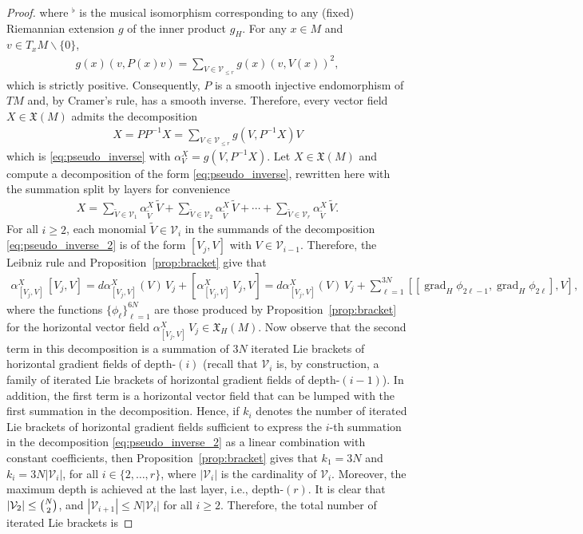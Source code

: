 \documentclass{article}
\theoremstyle{remark}
\newcommand{\M}{M}
\newcommand{\X}{\mathfrak{X}(\M)}
\newcommand{\XH}{\mathfrak{X}_H(\M)}
\DeclareMathOperator{\grad}{\mathrm{grad}}
\begin{document}
\begin{proof}
    where $^\flat$ is the musical isomorphism corresponding to any (fixed) Riemannian extension $g$ of the inner product $g_H$. For any $x\in \M$ and $v\in T_x\M\backslash\{0\}$,
    \begin{align*}
        g(x)(v,P(x)v) = \sum_{V\in\mathcal{V}_{\leq r}} g(x)(v,V(x))^2,
    \end{align*}
    which is strictly positive. Consequently, $P$ is a smooth injective endomorphism of $T\M$ and, by Cramer's rule, has a smooth inverse. Therefore, every vector field $X\in\X$ admits the decomposition
    \begin{align*}
        X = PP^{-1}X = \sum_{V\in\mathcal{V}_{\leq r}} g(V,P^{-1}X) V
    \end{align*}
    which is \eqref{eq:pseudo_inverse} with $\alpha_V^X=g(V,P^{-1}X)$.
    Let $X\in\X$ and compute a decomposition of the form \eqref{eq:pseudo_inverse}, rewritten here with the summation split by layers for convenience
    \begin{align}
        X = \sum_{\tilde{V}\in\mathcal{V}_{1}}\alpha_{\tilde{V}}^X \,\tilde{V} + \sum_{\tilde{V}\in\mathcal{V}_{2}}\alpha_{\tilde{V}}^X \,\tilde{V} + \cdots + \sum_{\tilde{V}\in\mathcal{V}_{r}}\alpha_{\tilde{V}}^X \,\tilde{V}. \label{eq:pseudo_inverse_2}
    \end{align}
    For all $i\geq 2$, each monomial $\tilde{V}\in \mathcal{V}_{i}$ in the summands of the decomposition \eqref{eq:pseudo_inverse_2} is of the form $[V_j,V]$ with $V\in \mathcal{V}_{i-1}$. Therefore, the Leibniz rule and Proposition~\ref{prop:bracket} give that
    \begin{align*}
        \alpha_{[V_j,V]}^X \,[V_j,V] = d\alpha_{[V_j,V]}^X(V) \, V_j + [\alpha_{[V_j,V]}^X\,V_j, V] =  d\alpha_{[V_j,V]}^X(V) \,V_j + \sum_{\ell=1}^{3N}[[\grad_H\phi_{2\ell-1},\grad_H\phi_{2\ell}], V], 
    \end{align*}
    where the functions $\{\phi_{\ell}\}_{\ell=1}^{6N}$ are those produced by Proposition~\ref{prop:bracket} for the horizontal vector field $\alpha_{[V_j,V]}^X\,V_j\in\XH$. Now observe that the second term in this decomposition is a summation of $3N$ iterated Lie brackets of horizontal gradient fields of depth-$(i)$ (recall that $\mathcal{V}_{i}$ is, by construction, a family of iterated Lie brackets of horizontal gradient fields of depth-$(i-1)$). In addition, the first term is a horizontal vector field that can be lumped with the first summation in the decomposition. Hence, if $k_i$ denotes the number of iterated Lie brackets of horizontal gradient fields sufficient to express the $i$-th summation in the decomposition \eqref{eq:pseudo_inverse_2} as a linear combination with constant coefficients, then Proposition~\ref{prop:bracket} gives that $k_1=3N$ and $k_{i}= 3N|\mathcal{V}_{i}|$, for all $i\in\{2,\dots,r\}$, where $|\mathcal{V}_{i}|$ is the cardinality of $\mathcal{V}_{i}$. Moreover, the maximum depth is achieved at the last layer, i.e., depth-$(r)$. It is clear that $|\mathcal{V}_2|\leq\tbinom{N}{2}$, and $|\mathcal{V}_{i+1}|\leq N|\mathcal{V}_i|$ for all $i\geq 2$. Therefore, the total number of iterated Lie brackets is

\end{proof}
\end{document}
